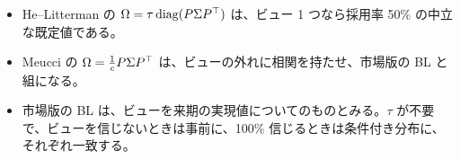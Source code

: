\begin{keybox}[この章のまとめ]
\begin{itemize}
\item He--Litterman の $\Omega=\tau\operatorname{diag}(P\Sigma P^{\top})$ は、ビュー 1 つなら採用率 50\% の中立な既定値である。
\item Meucci の $\Omega=\frac1cP\Sigma P^{\top}$ は、ビューの外れに相関を持たせ、市場版の BL と組になる。
\item 市場版の BL は、ビューを来期の実現値についてのものとみる。$\tau$ が不要で、ビューを信じないときは事前に、100\% 信じるときは条件付き分布に、それぞれ一致する。
\end{itemize}
\end{keybox}

